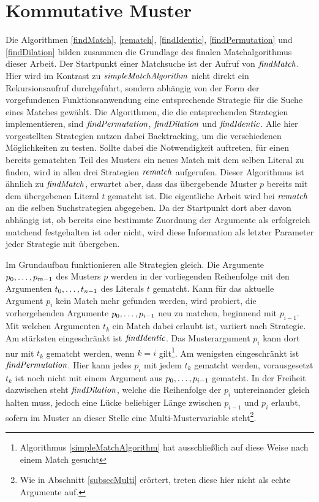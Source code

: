 \section{Kommutative Muster} \label{subsecACMuster}

Die Algorithmen \ref{findMatch}, \ref{rematch}, \ref{findIdentic}, \ref{findPermutation} und \ref{findDilation} bilden zusammen die Grundlage des finalen Matchalgorithmus dieser Arbeit. Der Startpunkt einer Matchsuche ist der Aufruf von $\mathit{findMatch}$. Hier wird im Kontrast zu $\mathit{simpleMatchAlgorithm}$ nicht direkt ein Rekursionsaufruf durchgeführt, sondern abhängig von der Form der vorgefundenen Funktionsanwendung eine entsprechende Strategie für die Suche eines Matches gewählt. Die Algorithmen, die die entsprechenden Strategien implementieren, sind $\mathit{findPermutation}$, $\mathit{findDilation}$ und $\mathit{findIdentic}$. Alle hier vorgestellten Strategien nutzen dabei Backtracking, um die verschiedenen Möglichkeiten zu testen. Sollte dabei die Notwendigkeit auftreten, für einen bereits gematchten Teil des Musters ein neues Match mit dem selben Literal zu finden, wird in allen drei Strategien $\mathit{rematch}$ aufgerufen. Dieser Algorithmus ist ähnlich zu $\mathit{findMatch}$, erwartet aber, dass das übergebende Muster $p$ bereits mit dem übergebenen Literal $t$ gematcht ist. Die eigentliche Arbeit wird bei $\mathit{rematch}$ an die selben Suchstrategien abgegeben. Da der Startpunkt dort aber davon abhängig ist, ob bereits eine bestimmte Zuordnung der Argumente als erfolgreich matchend festgehalten ist oder nicht, wird diese Information als letzter Parameter jeder Strategie mit übergeben.


Im Grundaufbau funktionieren alle Strategien gleich. Die Argumente ${p}_{0}, \dots, {p}_{m-1}$ des Musters $p$ werden in der vorliegenden Reihenfolge mit den Argumenten ${t}_{0}, \dots, {t}_{n-1}$ des Literals $t$ gematcht. Kann für das aktuelle Argument $p_i$ kein Match mehr gefunden werden, wird probiert, die vorhergehenden Argumente ${p}_{0}, \dots, {p}_{i-1}$ neu zu matchen, beginnend mit $p_{i-1}$. Mit welchen Argumenten $t_k$ ein Match dabei erlaubt ist, variiert nach Strategie. Am stärksten eingeschränkt ist $\mathit{findIdentic}$. Das Musterargument $p_i$ kann dort nur mit $t_k$ gematcht werden, wenn $k = i$ gilt\footnote{Algorithmus \ref{simpleMatchAlgorithm} hat ausschließlich auf diese Weise nach einem Match gesucht}. Am wenigsten eingeschränkt ist $\mathit{findPermutation}$. Hier kann jedes $p_i$ mit jedem $t_k$ gematcht werden, vorausgesetzt $t_k$ ist noch nicht mit einem Argument aus ${p}_{0}, \dots, {p}_{i-1}$ gematcht. In der Freiheit dazwischen steht $\mathit{findDilation}$, welche die Reihenfolge der $p_i$ untereinander gleich halten muss, jedoch eine Lücke beliebiger Länge zwischen $p_{i-1}$ und $p_i$ erlaubt, sofern im Muster an dieser Stelle eine Multi-Mustervariable steht\footnote{Wie in Abschnitt \ref{subsecMulti} erörtert, treten diese hier nicht als echte Argumente auf.}.

